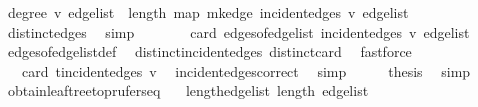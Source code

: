 \begin{isabellebody}
\ {\isachardoublequoteopen}degree\ v\ edge{\isacharunderscore}{\kern0pt}list\ {\isacharequal}{\kern0pt}\ length\ {\isacharparenleft}{\kern0pt}map\ mk{\isacharunderscore}{\kern0pt}edge\ {\isacharparenleft}{\kern0pt}incident{\isacharunderscore}{\kern0pt}edges\ v\ edge{\isacharunderscore}{\kern0pt}list{\isacharparenright}{\kern0pt}{\isacharparenright}{\kern0pt}{\isachardoublequoteclose}\ \isamarkupfalse%
\ distinct{\isacharunderscore}{\kern0pt}edges\ \isamarkupfalse%
\ simp\isanewline
\ \ \isamarkupfalse%
\ \isamarkupfalse%
\ {\isachardoublequoteopen}{\isasymdots}\ {\isacharequal}{\kern0pt}\ card\ {\isacharparenleft}{\kern0pt}edges{\isacharunderscore}{\kern0pt}of{\isacharunderscore}{\kern0pt}edge{\isacharunderscore}{\kern0pt}list\ {\isacharparenleft}{\kern0pt}incident{\isacharunderscore}{\kern0pt}edges\ v\ edge{\isacharunderscore}{\kern0pt}list{\isacharparenright}{\kern0pt}{\isacharparenright}{\kern0pt}{\isachardoublequoteclose}\ \isamarkupfalse%
\ edges{\isacharunderscore}{\kern0pt}of{\isacharunderscore}{\kern0pt}edge{\isacharunderscore}{\kern0pt}list{\isacharunderscore}{\kern0pt}def\ \isamarkupfalse%
\ distinct{\isacharunderscore}{\kern0pt}incident{\isacharunderscore}{\kern0pt}edges\ distinct{\isacharunderscore}{\kern0pt}card\ \isamarkupfalse%
\ fastforce\isanewline
\ \ \isamarkupfalse%
\ \isamarkupfalse%
\ {\isachardoublequoteopen}{\isasymdots}\ {\isacharequal}{\kern0pt}\ card\ {\isacharparenleft}{\kern0pt}t{\isachardot}{\kern0pt}incident{\isacharunderscore}{\kern0pt}edges\ v{\isacharparenright}{\kern0pt}{\isachardoublequoteclose}\ \isamarkupfalse%
\ incident{\isacharunderscore}{\kern0pt}edges{\isacharunderscore}{\kern0pt}correct\ \isamarkupfalse%
\ simp\isanewline
\ \ \isamarkupfalse%
\ \isamarkupfalse%
\ {\isacharquery}{\kern0pt}thesis\ \isamarkupfalse%
\ simp\isanewline
{}\isamarkupfalse%
%
\endisatagproof
{\isafoldproof}%
%
\isadelimproof
\isanewline
%
\endisadelimproof
\isanewline
{}\isamarkupfalse%
\ obtain{\isacharunderscore}{\kern0pt}leaf{\isacharunderscore}{\kern0pt}tree{\isacharunderscore}{\kern0pt}to{\isacharunderscore}{\kern0pt}prufer{\isacharunderscore}{\kern0pt}seq{\isacharcolon}{\kern0pt}\isanewline
\ \ \ length{\isacharunderscore}{\kern0pt}edge{\isacharunderscore}{\kern0pt}list{\isacharcolon}{\kern0pt}\ {\isachardoublequoteopen}length\ edge{\isacharunderscore}{\kern0pt}list\ {\isasymge}\ {}{\isachardoublequoteclose}\isanewline

\end{isabellebody}
